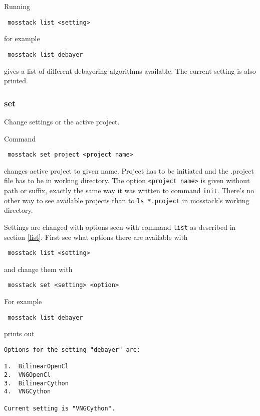 \documentclass[twoside,a4paper]{refart}
\begin{document}
Running

\begin{verbatim}
 mosstack list <setting>
\end{verbatim}

for example

\begin{verbatim}
 mosstack list debayer
\end{verbatim}

gives a list of different debayering algorithms available. The current setting is also printed.

\subsubsection{set}
\label{set}

Change settings or the active project.

Command
\begin{verbatim}
 mosstack set project <project name>
\end{verbatim}

changes active project to given name. Project has to be initiated and the .project file has to be in working directory.
The option \texttt{<project name>} is given without path or suffix, exactly the same way it was written to command 
\texttt{init}. There's no other way to see available projects than to \texttt{ls *.project} in mosstack's working 
directory.

Settings are changed with options seen with command \texttt{list} as described in section \ref{list}. First see what
options there are available with

\begin{verbatim}
 mosstack list <setting>
\end{verbatim}

and change them with

\begin{verbatim}
 mosstack set <setting> <option>
\end{verbatim}

For example

\begin{verbatim}
 mosstack list debayer
\end{verbatim}

prints out

\begin{verbatim}
Options for the setting "debayer" are:

1.  BilinearOpenCl
2.  VNGOpenCl
3.  BilinearCython
4.  VNGCython

Current setting is "VNGCython".

\end{verbatim}
\end{document}
